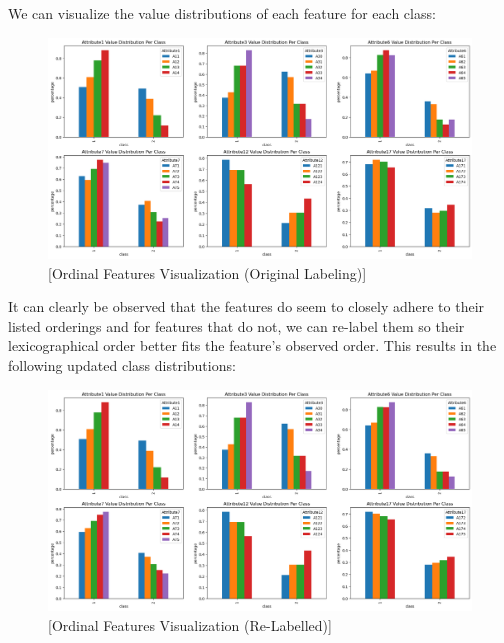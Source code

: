 \documentclass{article}
\begin{document}
    \newpage

    We can visualize the value distributions of each feature for each class:

    \begin{figure}[H]
        \centering
        \includegraphics[width=\textwidth, height=0.3\textheight]{./I_1_g_c.png}
        \caption{[Ordinal Features Visualization (Original Labeling)]}
    \end{figure}

    It can clearly be observed that the features do seem to closely adhere to their listed orderings and for features that do not, we can re-label them so their
    lexicographical order better fits the feature's observed order. This results in the following updated class distributions:

    \begin{figure}[H]
        \centering
        \includegraphics[width=\textwidth, height=0.3\textheight]{./I_1_g_d.png}
        \caption{[Ordinal Features Visualization (Re-Labelled)]}
    \end{figure}
    
    \newpage
\end{document}
